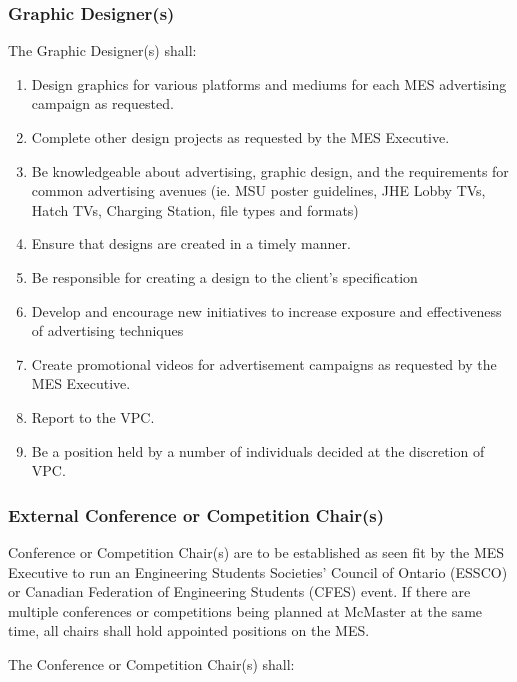 \subsubsection{Graphic Designer(s)}
\label{graphic-designers}
The Graphic Designer(s) shall:

\begin{enumerate}
 \item
  Design graphics for various platforms and mediums for each MES advertising campaign as requested.
 \item
  Complete other design projects as requested by the MES Executive.
 \item
  Be knowledgeable about advertising, graphic design, and the requirements for common advertising avenues (ie. MSU poster guidelines, JHE Lobby TVs, Hatch TVs, Charging Station, file types and formats)
 \item
  Ensure that designs are created in a timely manner.
 \item
  Be responsible for creating a design to the client's specification
 \item
  Develop and encourage new initiatives to increase exposure and effectiveness of advertising techniques
 \item
  Create promotional videos for advertisement campaigns as requested by the MES Executive.
 \item
  Report to the VPC.
 \item
  Be a position held by a number of individuals decided at the discretion of VPC.

\end{enumerate}

\subsubsection{External Conference or Competition Chair(s)}
\label{external-conference-or-competition-chairs}
Conference or Competition Chair(s) are to be established as seen fit by
the MES Executive to run an Engineering Students Societies' Council of
Ontario (ESSCO) or Canadian Federation of Engineering Students (CFES)
event. If there are multiple conferences or competitions being planned
at McMaster at the same time, all chairs shall hold appointed positions
on the MES.

The Conference or Competition Chair(s) shall:

